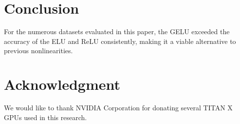 \documentclass{article}
\begin{document}
\section{Conclusion}
For the numerous datasets evaluated in this paper, the GELU exceeded the accuracy of the ELU and ReLU consistently, making it a viable alternative to previous nonlinearities.

\section*{Acknowledgment}
We would like to thank NVIDIA Corporation for donating several TITAN X GPUs used in this research.




\newpage
\appendix
\end{document}
